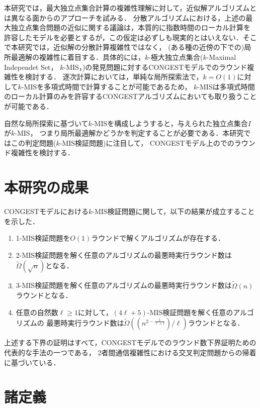 \documentclass[a4j,twoside]{jarticle}
\newcommand{\CONGEST}{\textsf{CONGEST}}
\theoremstyle{definition}
\begin{document}
\begin{論文概要}
本研究では，最大独立点集合計算の複雑性理解に対して，近似解アルゴリズムとは異なる面からのアプローチを試みる．
分散アルゴリズムにおける，上述の最大独立点集合問題の近似に関する議論は，本質的に指数時間のローカル計算を
許容したモデルを必要とするが，この仮定は必ずしも現実的とはいえない．そこで本研究では，近似解の分散計算複雑性ではなく，
(ある種の近傍の下での)局所最適解の複雑性に着目する．具体的には，$k$-極大独立点集合($k$-Maximal Independet Set， $k$-MIS，\cite{bollobas1991generalised})の発見問題に対する{\CONGEST}モデルでのラウンド複雑性を検討する．
逐次計算においては，単純な局所探索法で，$k=O(1)$に対して$k$-MISを多項式時間で計算することが可能であるため，
$k$-MISは多項式時間のローカル計算のみを許容する{\CONGEST}アルゴリズムにおいても取り扱うことが可能である．

自然な局所探索に基づいて$k$-MISを構成しようすると，与えられた独立点集合$I$が$k$-MIS，
つまり局所最適解かどうかを判定することが必要である．本研究ではこの判定問題($k$-MIS検証問題)に注目して，
{\CONGEST}モデル上のでのラウンド複雑性を検討する．

\section{本研究の成果}
{\CONGEST}モデルにおける$k$-MIS検証問題に関して，以下の結果が成立することを示した．
\begin{enumerate}
\item 1-MIS検証問題を$O(1)$ラウンドで解くアルゴリズムが存在する．
\item 2-MIS検証問題を解く任意のアルゴリズムの最悪時実行ラウンド数は$\tilde{\Omega} (\sqrt{n})$となる．
\item 3-MIS検証問題を解く任意のアルゴリズムの最悪時実行ラウンド数は$\tilde{\Omega}(n)$ラウンドとなる．
\item 任意の自然数$\ell \geq 1$に対して，$(4\ell + 5)$-MIS検証問題を解く任意のアルゴリズムの
最悪時実行ラウンド数は$\tilde{\Omega}\left((n^{2 - \frac{1}{\ell+1}})/\ell\right)$ラウンドとなる．
\end{enumerate}

上述する下界の証明はすべて，{\CONGEST}モデルでのラウンド数下界証明ための代表的な手法の一つである，
2者間通信複雑性における交叉判定問題からの帰着に基づいている．

\section{諸定義}

\end{論文概要}
\end{document}
